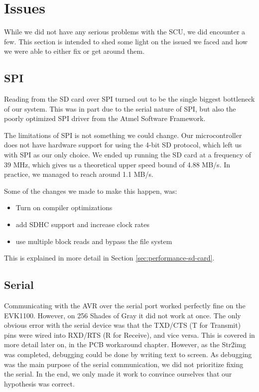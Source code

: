 \section{Issues}
While we did not have any serious problems with the SCU, we did
encounter a few. This section is intended to shed some light on the
issued we faced and how we were able to either fix or get around them. 

\subsection{SPI}
\label{sec:avr-spi-issues}
Reading from the \ac{SD} card over \ac{SPI} turned out to be the single biggest
bottleneck of our system. This was in part due to the serial nature of \ac{SPI},
but also the poorly optimized \ac{SPI} driver from the Atmel Software Framework.

The limitations of \ac{SPI} is not something we could change. Our
microcontroller does not have hardware support for using the 4-bit \ac{SD}
protocol, which left us with \ac{SPI} as our only choice. We ended up running
the \ac{SD} card at a frequency of 39 MHz, which gives us a theoretical upper
speed bound of 4.88 MB/s. In practice, we managed to reach around 1.1 MB/s.

Some of the changes we made to make this happen, was: \vspace{-1.0em}
\begin{itemize}
  \item Turn on compiler optimizations \vspace{-1.0em}
  \item add SDHC support and increase clock rates\vspace{-1.0em}
  \item use multiple block reads and bypass the file system
\end{itemize}

This is explained in more detail in Section \ref{sec:performance-sd-card}.

\subsection{Serial}
\label{sec:avr-serial-issues}
Communicating with the AVR over the serial port worked perfectly fine on the
EVK1100. However, on 256 Shades of Gray it did not work at once. The
only obvious error with the serial device was that the TXD/CTS (T for Transmit)
pins were wired into RXD/RTS (R for Receive), and vice versa. This is covered 
in more detail later on, in the PCB workaround chapter. However, 
as the Str2img was completed, debugging could be done by writing text to screen.
As debugging was the main purpose of the serial communication, we did not prioritize
fixing the serial. In the end, we only made it work to convince ourselves 
that our hypothesis was correct.

